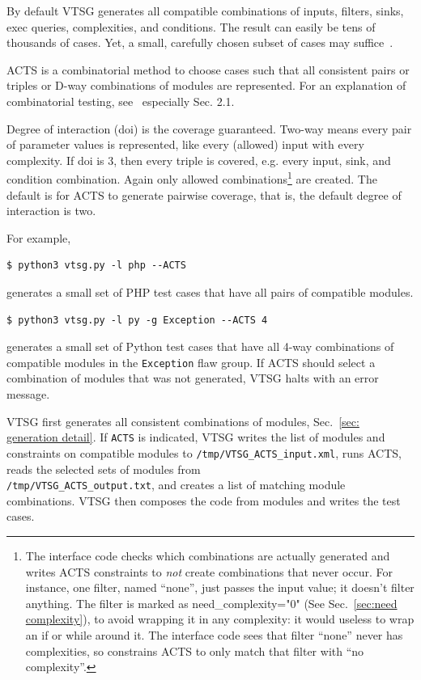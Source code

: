 \documentclass[12pt]{article}
\begin{document}
By default VTSG generates all compatible combinations of inputs, filters, sinks,
exec queries, complexities, and conditions.  The result can easily be tens of
thousands of cases.  Yet, a small, carefully chosen subset of cases may
suffice~\cite{SWInteractions2004}.

ACTS is a combinatorial method to choose cases such that all consistent
pairs or triples or D-way combinations of modules are represented.  For an
explanation of combinatorial testing, see~\cite{KuhnEtAl2010PracCT} especially
Sec. 2.1.

Degree of interaction (doi) is the coverage guaranteed.  Two-way means every
pair of parameter values is represented, like every (allowed) input with every
complexity.  If doi is 3, then every triple is covered, e.g. every input, sink,
and condition combination.  Again only allowed combinations\footnote{The
interface code checks which combinations are actually generated and
writes ACTS constraints to \emph{not} create combinations that never occur.
For instance, one filter, named ``none'', just passes the input value; it
doesn't filter anything.  The filter is marked as need\_complexity="0" (See
Sec.~\ref{sec:need complexity}), to avoid wrapping it in any complexity: it
would useless to wrap an if or while around it.  The interface code sees that
filter ``none'' never has complexities, so constrains ACTS to only match that
filter with ``no complexity''.
}
are created.  The default is for ACTS to generate pairwise coverage, that is,
the default degree of interaction is two.

For example,
\begin{verbatim}
$ python3 vtsg.py -l php --ACTS
\end{verbatim}
generates a small set of PHP test cases that have all pairs of compatible
modules.
\begin{verbatim}
$ python3 vtsg.py -l py -g Exception --ACTS 4
\end{verbatim}
generates a small set of Python test cases that have all 4-way combinations of
compatible modules in the \verb|Exception| flaw group.
If ACTS should select a combination of modules that was not generated, VTSG
halts with an error message.

VTSG first generates all consistent combinations of modules,
Sec.~\ref{sec: generation detail}.  If \verb|ACTS| is indicated, VTSG writes
the list of modules and constraints on compatible modules to
\verb|/tmp/VTSG_ACTS_input.xml|, runs ACTS, reads the selected sets of modules
from \\ \verb|/tmp/VTSG_ACTS_output.txt|, and creates a list of matching module
combinations.  VTSG then composes the code from modules and writes the test
cases.
\end{document}

